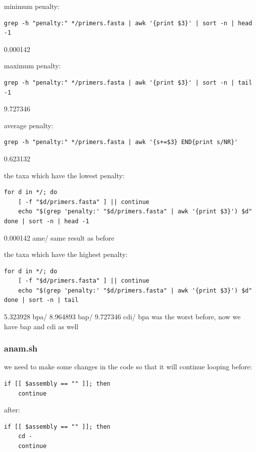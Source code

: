 \documentclass[11pt]{article}
\begin{document}
minimum penalty:
\begin{verbatim}
grep -h "penalty:" */primers.fasta | awk '{print $3}' | sort -n | head -1
\end{verbatim}
0.000142


maximum penalty:
\begin{verbatim}
grep -h "penalty:" */primers.fasta | awk '{print $3}' | sort -n | tail -1
\end{verbatim}
9.727346


average penalty:
\begin{verbatim}
grep -h "penalty:" */primers.fasta | awk '{s+=$3} END{print s/NR}'
\end{verbatim}
0.623132

the taxa which have the lowest penalty:
\begin{verbatim}
for d in */; do
    [ -f "$d/primers.fasta" ] || continue
    echo "$(grep 'penalty:' "$d/primers.fasta" | awk '{print $3}') $d"
done | sort -n | head -1
\end{verbatim}
0.000142 ame/
same result as before


the taxa which have the highest penalty:
\begin{verbatim}
for d in */; do
    [ -f "$d/primers.fasta" ] || continue
    echo "$(grep 'penalty:' "$d/primers.fasta" | awk '{print $3}') $d"
done | sort -n | tail    
\end{verbatim}
5.323928 bpa/
8.964893 bap/
9.727346 cdi/
bpa was the worst before, now we have bap and cdi as well
\subsubsection{anam.sh}
\label{sec:orgf9e136d}

we need to make some changes in the code so that it will continue looping
before:
\begin{verbatim}
if [[ $assembly == "" ]]; then
    continue
\end{verbatim}

after:
\begin{verbatim}
if [[ $assembly == "" ]]; then
    cd -
    continue
\end{verbatim}
\end{document}
